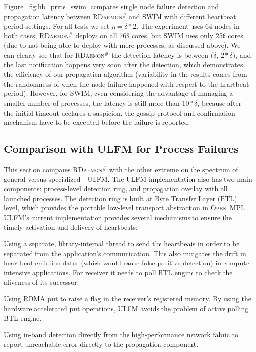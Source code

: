 \documentclass[sigconf]{acmart}
\newcommand{\ompi}[0]{\textsc{Open~MPI}\xspace}
\newcommand{\ulfm}[0]{\textsc{ULFM}\xspace}
\newcommand{\ourwork}[0]{\textsc{RDaemon}\ensuremath{^\#}\xspace}
\begin{document}
Figure~\ref{fig:hb_prrte_swim} compares single node failure detection and propagation latency between \ourwork and SWIM 
with different heartbeat period settings. For all tests we set $ \eta = \delta * 2 $. The 
experiment uses 64 nodes in both cases; \ourwork deploys on all 768 cores, but SWIM uses only 
256 cores (due to not being able to deploy with more processes, as discussed above).
 We can clearly see that for \ourwork the detection latency is between ($\delta$, $2*\delta$), and the last notification happens very soon after the detection, which demonstrates the efficiency of our propagation algorithm (variability in the results comes from the randomness of when the node failure happened with respect to the heartbeat period). However, for SWIM, even considering the advantage of managing a 
 smaller number of processes, the latency is still more than $10*\delta$, because after the initial timeout declares a suspicion, the gossip protocol and confirmation mechanism have to be executed
before the failure is reported.

\subsection{Comparison with \ulfm for Process Failures}
This section compares \ourwork with the other extreme on the spectrum of
general versus specialized---\ulfm. The \ulfm implementation also has two
 main components: process-level detection ring, and propagation overlay with all launched processes. The detection ring is built at Byte Transfer Layer (BTL) level, which provides the portable low-level transport abstraction in \ompi. \ulfm's current implementation provides several mechanisms to ensure the timely activation and delivery of heartbeats:
\begin{compactenum}
  \item Using a separate, library-internal thread to send the heartbeats in order to be separated from the application's communication. This also mitigates the drift in heartbeat
  emission dates (which would cause false positive detection) in compute-intensive applications.
  For receiver it needs to poll BTL engine to check the aliveness of its successor.
  \item Using RDMA put to raise a flag in the receiver's registered memory. By using the hardware accelerated put operations, \ulfm avoids the problem of active polling BTL engine.
  \item Using in-band detection directly from the high-performance network
  fabric to report unreachable error directly to the propagation component.
\end{compactenum}
\end{document}
